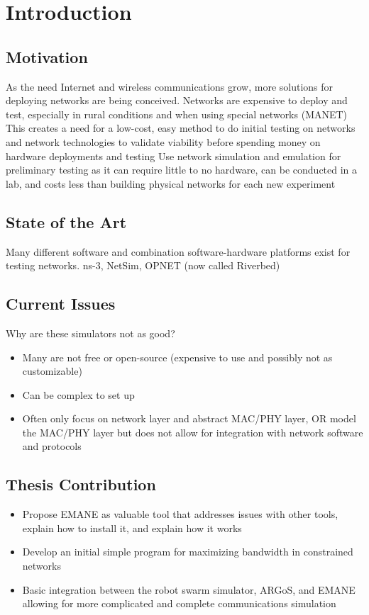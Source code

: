 \chapter{Introduction}
\label{ch:introduction}
\section{Motivation}
As the need Internet and wireless communications grow, more solutions for deploying networks are being conceived. 
Networks are expensive to deploy and test, especially in rural conditions and when using special networks (MANET) %
This creates a need for a low-cost, easy method to do initial testing on networks and network technologies to validate viability before spending money on hardware deployments and testing
Use network simulation and emulation for preliminary testing as it can require little to no hardware, can be conducted in a lab, and costs less than building physical networks for each new experiment

\section{State of the Art}
Many different software and combination software-hardware platforms exist for testing networks.
ns-3, NetSim, OPNET (now called Riverbed)

\section{Current Issues}
Why are these simulators not as good?
\begin{itemize}
    \item Many are not free or open-source (expensive to use and possibly not as customizable) %
    \item Can be complex to set up %
    \item Often only focus on network layer and abstract MAC/PHY layer, OR model the MAC/PHY layer but does not allow for integration with network software and protocols
\end{itemize}

\section{Thesis Contribution}
\begin{itemize}
    \item Propose EMANE as valuable tool that addresses issues with other tools, explain how to install it, and explain how it works
    \item Develop an initial simple program for maximizing bandwidth in constrained networks %
    \item Basic integration between the robot swarm simulator, ARGoS, and EMANE allowing for more complicated and complete communications simulation
\end{itemize}

